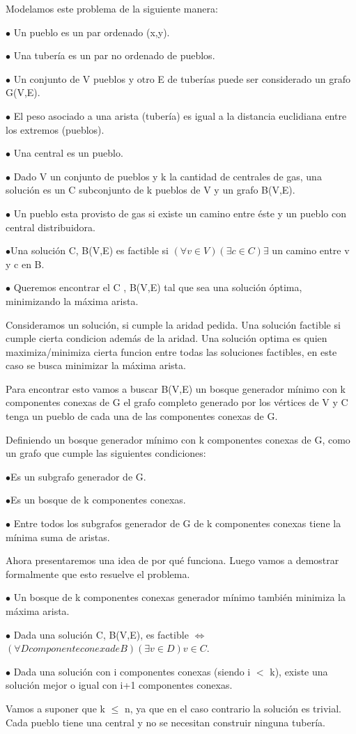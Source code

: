Modelamos este problema de la siguiente manera:

$\bullet$ Un pueblo es un par ordenado (x,y).

$\bullet$ Una tubería es un par no ordenado de pueblos.

$\bullet$ Un conjunto de V pueblos y otro E de tuberías puede ser considerado un grafo G(V,E).

$\bullet$ El peso asociado a una arista (tubería) es igual a la distancia euclidiana entre los extremos (pueblos).

$\bullet$ Una central es un pueblo.

$\bullet$ Dado V un conjunto de pueblos y k la cantidad de centrales de gas, una solución es un C subconjunto de k pueblos de V y un grafo B(V,E).

$\bullet$ Un pueblo esta provisto de gas si existe un camino entre éste y un pueblo con central distribuidora.

$\bullet$Una solución C, B(V,E) es factible si $(\forall v \in V)(\exists c \in C) \exists$ un camino entre v y c en B. 

$\bullet$ Queremos encontrar el C , B(V,E) tal que sea una solución óptima, minimizando la máxima arista.

Consideramos un solución, si cumple la aridad pedida. Una solución factible si cumple cierta condicion además de la aridad. Una solución optima es quien maximiza/minimiza cierta funcion entre todas las soluciones factibles, en este caso se busca minimizar la máxima arista.

Para encontrar esto vamos a buscar B(V,E) un bosque generador mínimo con k componentes conexas de G el grafo completo generado por los vértices de V y C tenga un pueblo de cada una de las componentes conexas de G.

Definiendo un bosque generador mínimo con k componentes conexas de G, como un grafo que cumple las siguientes condiciones:

$\bullet$Es un subgrafo generador de G. 

$\bullet$Es un bosque de k componentes conexas.

$\bullet$ Entre todos los subgrafos generador de G de k componentes conexas tiene la mínima suma de aristas.

Ahora presentaremos una idea de por qué funciona. Luego vamos a demostrar formalmente que esto resuelve el problema. 

$\bullet$ Un bosque de k componentes conexas generador mínimo también minimiza la máxima arista.

$\bullet$ Dada una solución C, B(V,E), es factible $\Longleftrightarrow$ $(\forall D componente conexa de B)(\exists v \in D) v \in C$.  

$\bullet$ Dada una solución con i componentes conexas (siendo i $<$ k), existe una solución mejor o igual con i+1 componentes conexas.

Vamos a suponer que k $\leq$ n, ya que en el caso contrario la solución es trivial. Cada pueblo tiene una central y no se necesitan construir ninguna tubería.